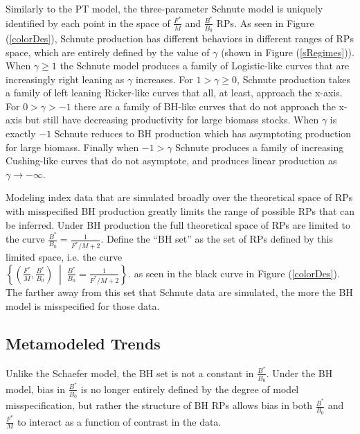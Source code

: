 %
Similarly to the PT model, the three-parameter Schnute model is uniquely
identified by each point in the space of $\frac{F^*}{M}$
and $\frac{B^*}{B_0}$ RPs. As seen in Figure (\ref{colorDes}), Schnute
production has different behaviors in different ranges of RPs space, which
are entirely defined by the value of $\gamma$ (shown in Figure (\ref{sRegimes})).
When $\gamma\ge1$ the Schnute model produces a family of Logistic-like curves that are
increasingly right leaning as $\gamma$ increases.
For $1>\gamma\ge0$, Schnute production takes a family of left leaning Ricker-like curves
that all, at least, approach the x-axis. For $0>\gamma>-1$ there are a family of BH-like
curves that do not approach the x-axis but still have decreasing productivity for large
biomass stocks. When $\gamma$ is exactly $-1$ Schnute reduces to BH production which has
asymptoting production for large biomass. Finally when $-1>\gamma$ Schnute
produces a family of increasing Cushing-like curves that do not asymptote, and produces
linear production as $\gamma\to-\infty$.

%
Modeling index data that are simulated broadly over the theoretical space of RPs
with misspecified BH production greatly limits the range of possible RPs that
can be inferred. Under BH production the full theoretical space of RPs are
limited to the curve \mbox{$\frac{B^*}{B_0}=\frac{1}{F^*/M+2}$.} Define the
``BH set'' as the set of RPs defined by this limited space, i.e. the curve \\
$\left\{\left(\frac{F^*}{M}, \frac{B^*}{B_0}\right) \;\middle|\; \frac{B^*}{B_0}=\frac{1}{F^*/M+2}\right\}$.
as seen in the {\color{red}black curve} in Figure (\ref{colorDes}).
The farther away from this set that Schnute data are simulated, the more the
BH model is misspecified for those data.

%
\subsection{Metamodeled Trends}


%
Unlike the Schaefer model, the BH set is not a constant in
$\frac{B^*}{B_0}$. Under the BH model, bias in $\frac{B^*}{B_0}$ is no
longer entirely defined by the degree of model misspecification, but rather the
structure of BH RPs allows bias in both $\frac{B^*}{B_0}$ and $\frac{F^*}{M}$
to interact as a function of contrast in the data.

